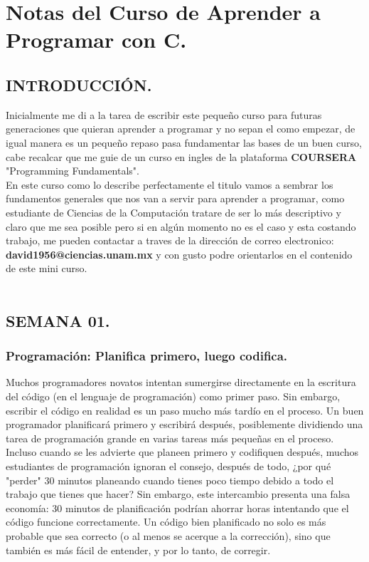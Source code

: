 \documentclass[12pt]{article}
\begin{document}

{\color{blue} \section*{\textbf{Notas del Curso de Aprender a Programar con C.}}}
\vspace{1em}

{\color{red} \subsection*{\textbf{INTRODUCCIÓN.}}}

Inicialmente me di a la tarea de escribir este pequeño curso para futuras generaciones que  quieran aprender a programar y no sepan el como empezar, de igual 
manera es un pequeño repaso pasa fundamentar las bases de un buen curso, cabe recalcar que me guie de un curso en ingles de la plataforma \textbf{COURSERA} "Programming Fundamentals".\\

En este curso como lo describe perfectamente el titulo vamos a sembrar los fundamentos generales que nos van a servir para aprender a programar, como estudiante de Ciencias de la Computación tratare de ser lo más descriptivo y claro que me sea 
posible pero si en algún momento no es el caso y esta costando trabajo, me pueden contactar a traves de la dirección de correo electronico: \textbf{david1956@ciencias.unam.mx} y con gusto podre orientarlos en el contenido de este mini curso.\\
\\


{\color{red} \subsection*{\textbf{SEMANA 01.}}}


{\color{blue} \subsubsection*{\textbf{Programación: Planifica primero, luego codifica.}}}

Muchos programadores novatos intentan sumergirse directamente en la escritura del código (en el lenguaje de programación) como primer paso. Sin embargo, escribir el código en realidad es un paso mucho más tardío en el proceso. Un buen programador planificará primero y escribirá después, posiblemente dividiendo una tarea de programación grande en varias tareas más pequeñas en el proceso. 
Incluso cuando se les advierte que planeen primero y codifiquen después, muchos estudiantes de programación ignoran el consejo, después de todo, ¿por qué "perder" 30 minutos planeando cuando tienes poco tiempo debido a todo el trabajo que tienes que hacer? Sin embargo, este intercambio presenta una falsa economía: 30 minutos de planificación podrían ahorrar horas 
intentando que el código funcione correctamente. 
Un código bien planificado no solo es más probable que sea correcto (o al menos se acerque a la corrección), sino que también es más fácil de entender, y por lo tanto, de corregir.\\
\end{document}
